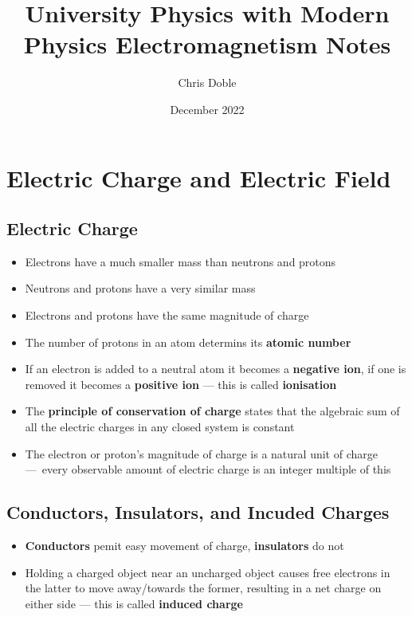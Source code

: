 \documentclass{article}
\title{University Physics with Modern Physics Electromagnetism Notes}
\author{Chris Doble}
\date{December 2022}
\begin{document}
\maketitle

\tableofcontents

\setcounter{section}{20}
\section{Electric Charge and Electric Field}

\subsection{Electric Charge}

\begin{itemize}
  \item Electrons have a much smaller mass than neutrons and protons

  \item Neutrons and protons have a very similar mass

  \item Electrons and protons have the same magnitude of charge

  \item The number of protons in an atom determins its \textbf{atomic number}

  \item If an electron is added to a neutral atom it becomes a \textbf{negative ion}, if one is removed it becomes a \textbf{positive ion} — this is called \textbf{ionisation}

  \item The \textbf{principle of conservation of charge} states that the algebraic sum of all the electric charges in any closed system is constant

  \item The electron or proton's magnitude of charge is a natural unit of charge — every observable amount of electric charge is an integer multiple of this
\end{itemize}

\subsection{Conductors, Insulators, and Incuded Charges}

\begin{itemize}
  \item \textbf{Conductors} pemit easy movement of charge, \textbf{insulators} do not

  \item Holding a charged object near an uncharged object causes free electrons in the latter to move away/towards the former, resulting in a net charge on either side — this is called \textbf{induced charge}
\end{itemize}
\end{document}
